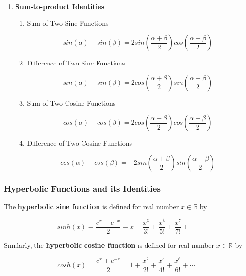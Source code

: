 \documentclass[a4paper,12pt]{article}
\newcommand{\s}{\vspace{1mm}}
\newcommand{\R}{\mathbb{R}}
\newenvironment{alist}{ %
\begin{enumerate}[label=(\alph*)]
}{
\end{enumerate}
}
\newenvironment{rlist}{ %
\begin{enumerate}[label=(\roman*)]
}{
\end{enumerate}
}
\begin{document}
\begin{alist}
\begin{rlist}
    $$2sin(\alpha)sin(\beta)=-cos(\alpha +\beta)+cos(\alpha -\beta)$$

    \item Product of Two Cosine Functions

    $$2cos(\alpha)cos(\beta)=cos(\alpha +\beta)+cos(\alpha -\beta)$$

    \item Product of Sine and Cosine Functions

    $$2sin(\alpha)cos(\beta)=sin(\alpha +\beta)-sin(\alpha -\beta)$$

  \end{rlist}
  \item \textbf{Sum-to-product Identities}
  \begin{rlist}
    \item Sum of Two Sine Functions

    $$sin(\alpha)+sin(\beta)=2sin(\frac{\alpha +\beta}{2})cos(\frac{\alpha -\beta}{2})$$

    \item Difference of Two Sine Functions

    $$sin(\alpha)-sin(\beta)=2cos(\frac{\alpha +\beta}{2})sin(\frac{\alpha -\beta}{2})$$

    \item Sum of Two Cosine Functions

    $$cos(\alpha)+cos(\beta)=2cos(\frac{\alpha +\beta}{2})cos(\frac{\alpha -\beta}{2})$$

    \item Difference of Two Cosine Functions

    $$cos(\alpha)-cos(\beta)=-2sin(\frac{\alpha +\beta}{2})sin(\frac{\alpha -\beta}{2})$$

  \end{rlist}
\end{alist}

\subsubsection{Hyperbolic Functions and its Identities}
The \textbf{hyperbolic sine function} is defined for real number $x\in \R$ by

$$sinh(x)=\frac{e^{x}-e^{-x}}{2}=x+\frac{x^{3}}{3!}+\frac{x^{5}}{5!}+\frac{x^{7}}{7!}+\cdots$$\s

Similarly, the \textbf{hyperbolic cosine function} is defined for real number $x\in \R$ by

$$cosh(x)=\frac{e^{x}+e^{-x}}{2}=1+\frac{x^{2}}{2!}+\frac{x^{4}}{4!}+\frac{x^{6}}{6!}+\cdots$$\s
\end{document}
